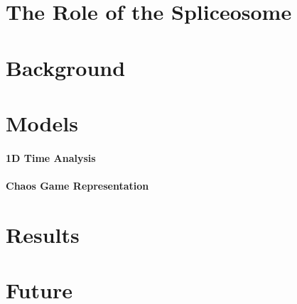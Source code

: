 \documentclass[12pt]{article}
\begin{document}
\section{The Role of the Spliceosome}
\paragraph*{}
\section{Background}
\section{Models}
\paragraph*{1D Time Analysis}
\paragraph*{Chaos Game Representation}

\section{Results}

\section{Future}



\end{document}

